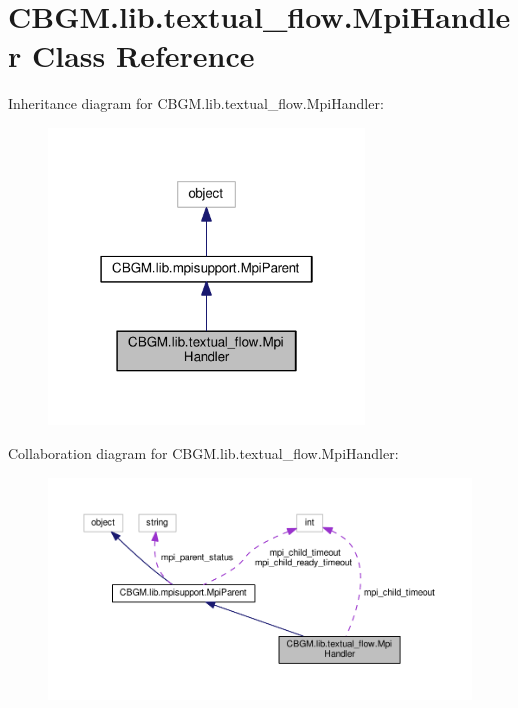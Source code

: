 \hypertarget{classCBGM_1_1lib_1_1textual__flow_1_1MpiHandler}{}\section{C\+B\+G\+M.\+lib.\+textual\+\_\+flow.\+Mpi\+Handler Class Reference}
\label{classCBGM_1_1lib_1_1textual__flow_1_1MpiHandler}


Inheritance diagram for C\+B\+G\+M.\+lib.\+textual\+\_\+flow.\+Mpi\+Handler\+:\nopagebreak
\begin{figure}[H]
\begin{center}
\leavevmode
\includegraphics[width=238pt]{classCBGM_1_1lib_1_1textual__flow_1_1MpiHandler__inherit__graph}
\end{center}
\end{figure}


Collaboration diagram for C\+B\+G\+M.\+lib.\+textual\+\_\+flow.\+Mpi\+Handler\+:\nopagebreak
\begin{figure}[H]
\begin{center}
\leavevmode
\includegraphics[width=350pt]{classCBGM_1_1lib_1_1textual__flow_1_1MpiHandler__coll__graph}
\end{center}
\end{figure}
